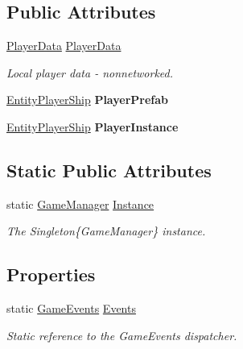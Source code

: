 \subsection*{Public Attributes}
\begin{DoxyCompactItemize}
\item 
\hyperlink{class_skyrates_1_1_data_1_1_player_data}{Player\-Data} \hyperlink{class_skyrates_1_1_game_1_1_game_manager_ad66cf44da1b4400f74853a247987a5df}{Player\-Data}
\begin{DoxyCompactList}\small\item\em Local player data -\/ nonnetworked. \end{DoxyCompactList}\item 
\hypertarget{class_skyrates_1_1_game_1_1_game_manager_a0b253df8947857d6e77732ecdb1353ca}{\hyperlink{class_skyrates_1_1_entity_1_1_entity_player_ship}{Entity\-Player\-Ship} {\bfseries Player\-Prefab}}\label{class_skyrates_1_1_game_1_1_game_manager_a0b253df8947857d6e77732ecdb1353ca}

\item 
\hypertarget{class_skyrates_1_1_game_1_1_game_manager_ad3aecb531a3d5f83a6ca86348d0b9965}{\hyperlink{class_skyrates_1_1_entity_1_1_entity_player_ship}{Entity\-Player\-Ship} {\bfseries Player\-Instance}}\label{class_skyrates_1_1_game_1_1_game_manager_ad3aecb531a3d5f83a6ca86348d0b9965}

\end{DoxyCompactItemize}
\subsection*{Static Public Attributes}
\begin{DoxyCompactItemize}
\item 
static \hyperlink{class_skyrates_1_1_game_1_1_game_manager}{Game\-Manager} \hyperlink{class_skyrates_1_1_game_1_1_game_manager_a5b1ce44932689e2e4b3ca18a238cc22e}{Instance}
\begin{DoxyCompactList}\small\item\em The Singleton\{\-Game\-Manager\} instance. \end{DoxyCompactList}\end{DoxyCompactItemize}
\subsection*{Properties}
\begin{DoxyCompactItemize}
\item 
static \hyperlink{class_skyrates_1_1_game_1_1_event_1_1_game_events}{Game\-Events} \hyperlink{class_skyrates_1_1_game_1_1_game_manager_acb90612bc562f5facb3218201154a35a}{Events}
\begin{DoxyCompactList}\small\item\em Static reference to the Game\-Events dispatcher. \end{DoxyCompactList}\end{DoxyCompactItemize}
